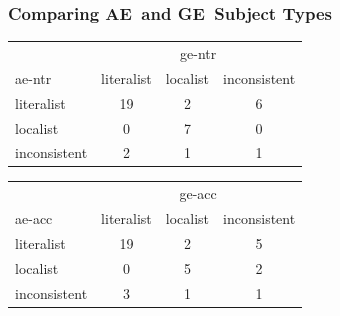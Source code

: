 \documentclass[fleqn,10pt,xcolor=dvipsnames]{beamer}
\renewcommand{\AE}{AE\xspace}
\newcommand{\GE}{GE\xspace}
\begin{document}
\begin{frame}
  \frametitle{Comparing \AE\ and \GE\ Subject Types}

  \begin{center}
    \begin{tabular}{lccc}
      & \multicolumn{3}{c}{ge-ntr} \\ \cmidrule(r){2-4}
      ae-ntr & literalist & localist & inconsistent \\ \midrule
      literalist   & 19 & 2 & 6\\
      localist     &  0 & 7 & 0 \\
      inconsistent &  2 & 1 & 1\\
    \end{tabular}
  \end{center}

  \medskip

  \begin{center}
    \begin{tabular}{lccc}
      & \multicolumn{3}{c}{ge-acc} \\ \cmidrule(r){2-4}
      ae-acc & literalist & localist & inconsistent \\ \midrule
      literalist   & 19 & 2 & 5\\
      localist     &  0 & 5 & 2 \\
      inconsistent &  3 & 1 & 1\\
    \end{tabular}
  \end{center}

\end{frame}
\end{document}
